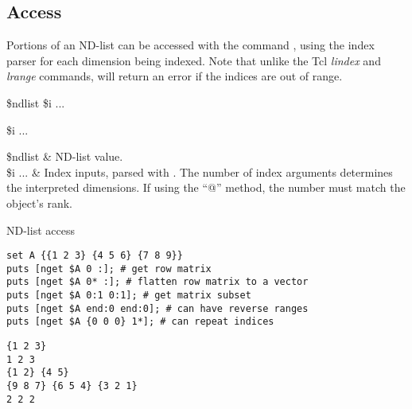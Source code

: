 \clearpage
\subsection{Access}
Portions of an ND-list can be accessed with the command , using the index parser  for each dimension being indexed.
Note that unlike the Tcl \textit{lindex} and \textit{lrange} commands,  will return an error if the indices are out of range.
\begin{syntax}
 \$ndlist \$i ...
\end{syntax}
\begin{syntax}
 \$i ...
\end{syntax}
\begin{args}
\$ndlist & ND-list value. \\
\$i ... & Index inputs, parsed with . 
The number of index arguments determines the interpreted dimensions.
If using the ``@'' method, the number must match the object's rank.
\end{args}
\begin{example}{ND-list access}
\begin{lstlisting}
set A {{1 2 3} {4 5 6} {7 8 9}}
puts [nget $A 0 :]; # get row matrix
puts [nget $A 0* :]; # flatten row matrix to a vector
puts [nget $A 0:1 0:1]; # get matrix subset
puts [nget $A end:0 end:0]; # can have reverse ranges
puts [nget $A {0 0 0} 1*]; # can repeat indices
\end{lstlisting}
\tcblower
\begin{lstlisting}
{1 2 3}
1 2 3
{1 2} {4 5}
{9 8 7} {6 5 4} {3 2 1}
2 2 2
\end{lstlisting}
\end{example}

\clearpage
